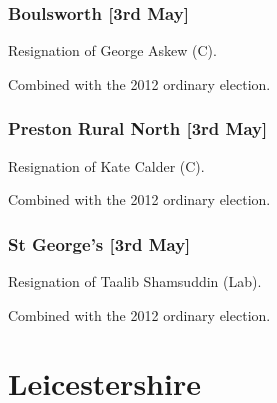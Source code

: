 \begin{resultsiii}

\subsubsection*{Boulsworth \hspace*{\fill}\nolinebreak[1]%
\enspace\hspace*{\fill}
[3rd May]}


Resignation of George Askew (C).

Combined with the 2012 ordinary election.


\subsubsection*{Preston Rural North \hspace*{\fill}\nolinebreak[1]%
\enspace\hspace*{\fill}
[3rd May]}


Resignation of Kate Calder (C).

Combined with the 2012 ordinary election.

\subsubsection*{St George's \hspace*{\fill}\nolinebreak[1]%
\enspace\hspace*{\fill}
[3rd May]}


Resignation of Taalib Shamsuddin (Lab).

Combined with the 2012 ordinary election.



\section{Leicestershire}



\end{resultsiii}
